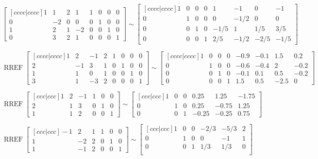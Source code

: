 \documentclass{article}
\DeclareMathOperator{\RREF}{RREF}
\begin{document}
  \[\begin{bmatrix}[cccc|cccc]
  1 & 1 & 2 & 1   & 1 & 0 & 0 & 0  \\
  0 & -2 & 0 & 0   & 0 & 1 & 0 & 0 \\
  1 & 2 & 1 & -2   & 0 & 0 & 1 & 0 \\
  0 & 3 & 2 & 1    & 0 & 0 & 0 & 1
\end{bmatrix}\sim\begin{bmatrix}[cccc|cccc]
  1 & 0 & 0 & 0 & 1 & -1 & 0 & -1 \\
  0 & 1 & 0 & 0 & 0 & -1/2 & 0 & 0 \\
  0 & 0 & 1 & 0 & -1/5 & 1 & 1/5 & 3/5 \\
  0 & 0 & 0 & 1 & 2/5 & -1/2 & -2/5 & -1/5
\end{bmatrix}\]

\[ \RREF  \begin{bmatrix}[cccc|cccc]
1 &2& -1& 2& 1& 0 &0& 0 \\
2 &-1& 3& 1& 0& 1& 0& 0\\
1 &1 &0 & 1 &0& 0& 1& 0\\
3 &1 &-3 &2 &0 &0 &0 &1
\end{bmatrix}\sim\begin{bmatrix}[cccc|cccc]
1 & 0 & 0 & 0 & -0.9 & -0.1 & 1.5 & 0.2\\ 
0 & 1 & 0 & 0 & -0.6 & -0.4& 2 & -0.2 \\ 
0 & 0 & 1 & 0 & -0.1 & 0.1 & 0.5 & -0.2\\ 
0 & 0 & 0 & 1 & 1.5 & 0.5 & -2.5 & 0
\end{bmatrix}\]

\[\RREF  \begin{bmatrix}[ccc|ccc]
 1  & 2 & -1 &  1 &  0&   0\\
  2 &  1 &  3 & 0  & 1  & 0\\
  1 &  1 &  2 &  0 &  0 &  1
\end{bmatrix}\sim\begin{bmatrix}[ccc|ccc]
1  & 0 &  0 &  0.25&   1.25&   -1.75\\
0  & 1  & 0  & 0.25 & -0.75  & 1.25\\
0  & 0  & 1 & -0.25 & -0.25  & 0.75
\end{bmatrix}\]

\[\RREF  \begin{bmatrix}[ccc|ccc]
 -1   &2  & 1 &  1 &  0 &  0\\
   1  &-2  & 2  & 0  & 1 &  0\\
   1  &-1 &  2 &  0 &  0   &1
\end{bmatrix}\sim\begin{bmatrix}[ccc|ccc]
   1 & 0&   0&  -2/3&  -5/3 & 2\\
   0  & 1  & 0  &0  &-1  & 1\\
   0  & 0  & 1 &  1/3 &  1/3&   0\\
\end{bmatrix}\]
\end{document}
